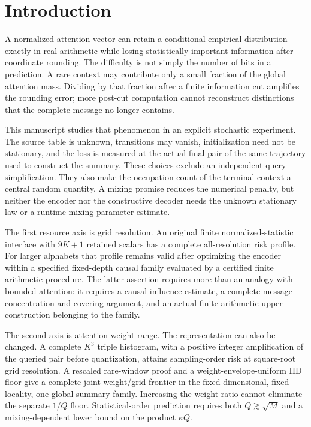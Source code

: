 \documentclass[11pt,letterpaper]{article}
\theoremstyle{definition}\newtheorem{definition}[theorem]{Definition}
\theoremstyle{remark}\newtheorem{remark}[theorem]{Remark}
\begin{document}
\section{Introduction}
A normalized attention vector can retain a conditional empirical distribution exactly in real arithmetic while losing statistically important information after coordinate rounding. The difficulty is not simply the number of bits in a prediction. A rare context may contribute only a small fraction of the global attention mass. Dividing by that fraction after a finite information cut amplifies the rounding error; more post-cut computation cannot reconstruct distinctions that the complete message no longer contains.

This manuscript studies that phenomenon in an explicit stochastic experiment. The source table is unknown, transitions may vanish, initialization need not be stationary, and the loss is measured at the actual final pair of the same trajectory used to construct the summary. These choices exclude an independent-query simplification. They also make the occupation count of the terminal context a central random quantity. A mixing promise reduces the numerical penalty, but neither the encoder nor the constructive decoder needs the unknown stationary law or a runtime mixing-parameter estimate.

The first resource axis is grid resolution. An original finite normalized-statistic interface with $9K+1$ retained scalars has a complete all-resolution risk profile. For larger alphabets that profile remains valid after optimizing the encoder within a specified fixed-depth causal family evaluated by a certified finite arithmetic procedure. The latter assertion requires more than an analogy with bounded attention: it requires a causal influence estimate, a complete-message concentration and covering argument, and an actual finite-arithmetic upper construction belonging to the family.

The second axis is attention-weight range. The representation can also be changed. A complete $K^3$ triple histogram, with a positive integer amplification of the queried pair before quantization, attains sampling-order risk at square-root grid resolution. A rescaled rare-window proof and a weight-envelope-uniform IID floor give a complete joint weight/grid frontier in the fixed-dimensional, fixed-locality, one-global-summary family. Increasing the weight ratio cannot eliminate the separate $1/Q$ floor. Statistical-order prediction requires both $Q\gtrsim\sqrt M$ and a mixing-dependent lower bound on the product $\kappa Q$.
\end{document}

